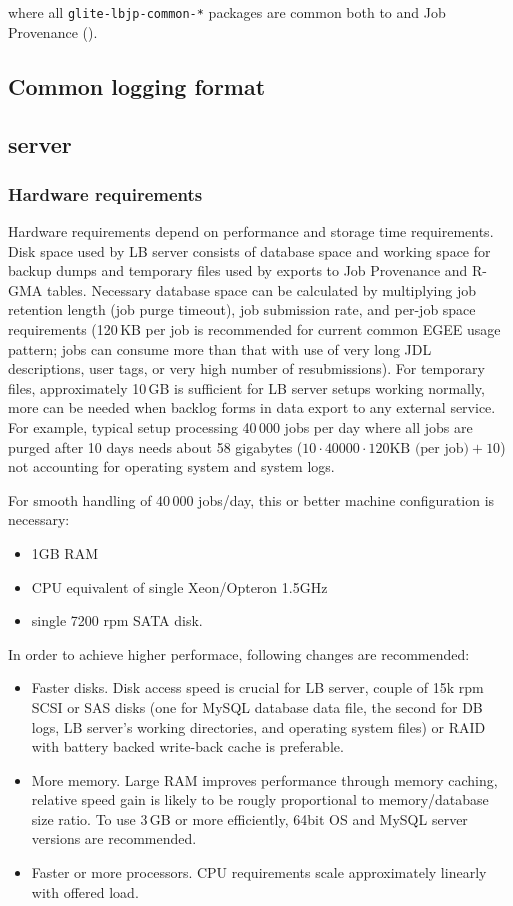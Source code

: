 where all \verb'glite-lbjp-common-*' packages are common both to \LB and 
Job Provenance (\JP).

\subsection{Common logging format}

\subsection{\LB server}

\subsubsection{Hardware requirements}
\label{inst:hw_req}

Hardware requirements depend on performance and storage time requirements.
Disk space used by LB server consists of database space and working space 
for backup dumps and temporary files used by exports to Job Provenance and
R-GMA tables. Necessary database space can be calculated by multiplying 
job retention length (job purge timeout), job submission rate, and  
per-job space requirements (120\,KB per job is recommended for current common 
EGEE usage pattern; jobs can consume more than that with use of very long
JDL descriptions, user tags, or very high number of resubmissions).
For temporary files, approximately 10\,GB is sufficient for LB server setups
working normally, more can be needed when backlog forms in data export
to any external service. For example, typical setup processing 40\,000 jobs per 
day where all jobs are purged after 10 days needs about 58 gigabytes
($10 \cdot 40000 \cdot 120 \mbox{KB (per job)} + 10$) not accounting for operating 
system and system logs.

For smooth handling of 40\,000 jobs/day, this or better machine configuration 
is necessary:
\begin{itemize}
\item 1GB RAM
\item CPU equivalent of single Xeon/Opteron 1.5GHz
\item single 7200 rpm SATA disk.
\end{itemize}
In order to achieve higher performace, following changes are recommended:
\begin{itemize}
\item Faster disks. Disk access speed is crucial for LB server, couple of 15k rpm
SCSI or SAS disks (one for MySQL database data file, the second for DB logs, LB server's
working directories, and operating system files) or RAID with battery backed 
write-back cache is preferable.
\item More memory. Large RAM improves performance through memory caching,
relative speed gain is likely to be rougly proportional to memory/database size ratio.
To use 3\,GB or more efficiently, 64bit OS and MySQL server versions are recommended.
\item Faster or more processors. CPU requirements scale approximately linearly with
offered load.
\end{itemize}

